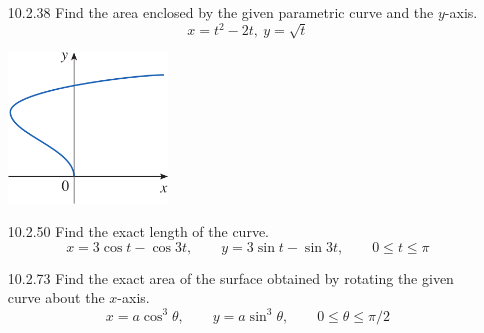 \documentclass{article}
\begin{document}
\begin{enumerate}
\newpage

\item[10.2.38]
    Find the area enclosed by the given parametric curve and the $y$-axis.
    \[x = t^2 - 2t ,\ y=\sqrt{t}\]

    \begin{center}
        \includegraphics[height=4cm]{./png/10.2.38.png}
    \end{center}

\vspace{4cm}

\item[10.2.50]
    Find the exact length of the curve. \[x=3\cos{t}-\cos{3t}, \qquad y=3\sin{t}-\sin{3t}, \qquad 0 \leqslant t \leqslant \pi\]

\vspace{5cm}

\item[10.2.73]
    Find the exact area of the surface obtained by rotating the given curve about the $x$-axis.
    \[x=a\cos^{3}{\theta}, \qquad y=a\sin^{3}{\theta}, \qquad 0 \leqslant \theta \leqslant \pi/2\]

\end{enumerate}
\end{document}
